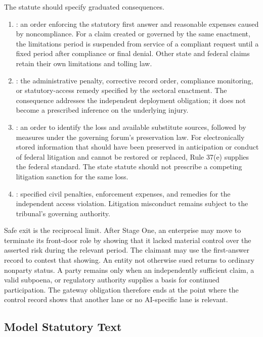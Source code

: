 The statute should specify graduated consequences.

\begin{enumerate}[leftmargin=2.2em]
\item {}: an order enforcing the statutory first answer and reasonable expenses caused by noncompliance. For a claim created or governed by the same enactment, the limitations period is suspended from service of a compliant request until a fixed period after compliance or final denial. Other state and federal claims retain their own limitations and tolling law.
\item {}: the administrative penalty, corrective record order, compliance monitoring, or statutory-access remedy specified by the sectoral enactment. The consequence addresses the independent deployment obligation; it does not become a prescribed inference on the underlying injury.
\item {}: an order to identify the loss and available substitute sources, followed by measures under the governing forum's preservation law. For electronically stored information that should have been preserved in anticipation or conduct of federal litigation and cannot be restored or replaced, Rule 37(e) supplies the federal standard. The state statute should not prescribe a competing litigation sanction for the same loss.
\item {}: specified civil penalties, enforcement expenses, and remedies for the independent access violation. Litigation misconduct remains subject to the tribunal's governing authority.
\end{enumerate}

Safe exit is the reciprocal limit. After Stage One, an enterprise may move to terminate its front-door role by showing that it lacked material control over the asserted risk during the relevant period. The claimant may use the first-answer record to contest that showing. An entity not otherwise sued returns to ordinary nonparty status. A party remains only when an independently sufficient claim, a valid subpoena, or regulatory authority supplies a basis for continued participation. The gateway obligation therefore ends at the point where the control record shows that another lane or no AI-specific lane is relevant.

\subsection{Model Statutory Text}
\label{sec:model-text}


